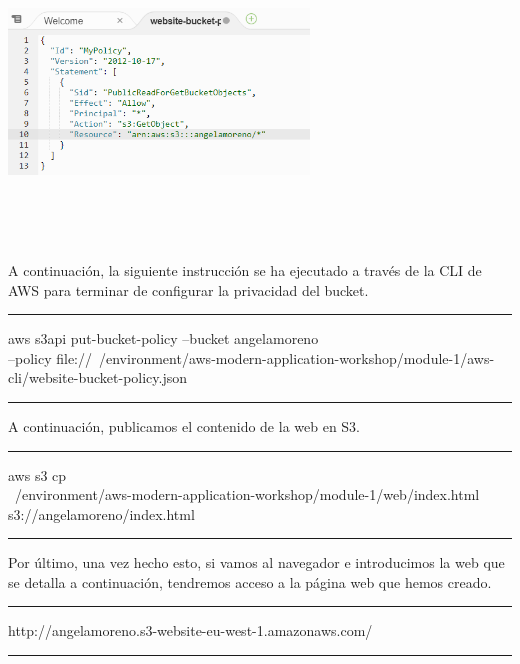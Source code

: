 \documentclass[english,runningheads,a4paper]{llncs}[2018/03/10]
\newenvironment{nscenter}
 {\parskip=0pt\par\nopagebreak\centering}
 {\par\noindent\ignorespacesafterend}
\begin{document}
\newline
\begin{nscenter}
\includegraphics[width=8cm,height=8cm,keepaspectratio]{./Contenedores/AWS/25.png}
\end{nscenter}
\newline
A continuación, la siguiente instrucción se ha ejecutado a través de la CLI de 
AWS para terminar de configurar la privacidad del bucket.
\begin{nscenter}


\noindent\rule{10cm}{0.4pt}

aws s3api put-bucket-policy --bucket angelamoreno\\ 
--policy file://~/environment/aws-modern-application-workshop/module-1/aws-cli/website-bucket-policy.json

\noindent\rule{10cm}{0.4pt}
\end{nscenter}
\newline
A continuación, publicamos el contenido de la web en S3.
\begin{nscenter}
\noindent\rule{10cm}{0.4pt}
\newline
aws s3 cp\\ ~/environment/aws-modern-application-workshop/module-1/web/index.html\\ s3://angelamoreno/index.html
\noindent\rule{10cm}{0.4pt}
\end{nscenter}
\newline
Por último, una vez hecho esto, si vamos al navegador e introducimos la web que 
se detalla a continuación, tendremos acceso a la página web que hemos creado.
\begin{nscenter}
\noindent\rule{10cm}{0.4pt}
http://angelamoreno.s3-website-eu-west-1.amazonaws.com/
\noindent\rule{10cm}{0.4pt}
\end{nscenter}
\end{document}
